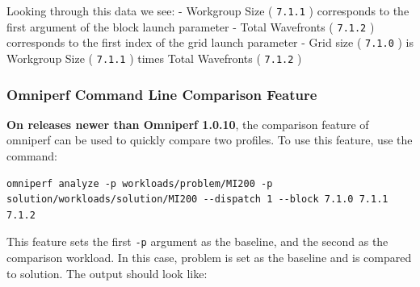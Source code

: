 \documentclass[
]{article}
\let\oldtexttt\texttt
\renewcommand{\texttt}[1]{
  \colorbox{Light}{\oldtexttt{#1}}
}
\begin{document}
Looking through this data we see: - Workgroup Size (\texttt{7.1.1})
corresponds to the first argument of the block launch parameter - Total
Wavefronts (\texttt{7.1.2}) corresponds to the first index of the grid
launch parameter - Grid size (\texttt{7.1.0}) is Workgroup Size
(\texttt{7.1.1}) times Total Wavefronts (\texttt{7.1.2})

\hypertarget{omniperf-command-line-comparison-feature}{%
\subsubsection{Omniperf Command Line Comparison
Feature}\label{omniperf-command-line-comparison-feature}}

\textbf{On releases newer than Omniperf 1.0.10}, the comparison feature
of omniperf can be used to quickly compare two profiles. To use this
feature, use the command:

\begin{Verbatim}
omniperf analyze -p workloads/problem/MI200 -p solution/workloads/solution/MI200 --dispatch 1 --block 7.1.0 7.1.1 7.1.2
\end{Verbatim}

This feature sets the first \texttt{-p} argument as the baseline, and
the second as the comparison workload. In this case, problem is set as
the baseline and is compared to solution. The output should look like:
\end{document}
